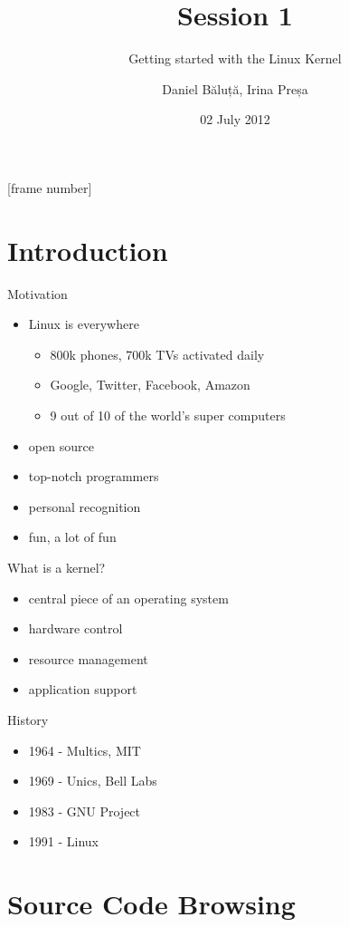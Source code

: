 \documentclass{workshop}
\title[Sesssion 1]{Session 1}
\subtitle{Getting started with the Linux Kernel}
\author{Daniel Băluță, Irina Preșa}
\date{02 July 2012}
\begin{document}
[frame number]

\frame{\titlepage}

\section{Introduction}

\begin{frame}{Motivation}
	\begin{itemize}
	\item Linux is everywhere
	\begin{itemize}
		\item 800k phones, 700k TVs activated daily
		\item Google, Twitter, Facebook, Amazon
		\item 9 out of 10 of the world's super computers
	\end{itemize}
	\item open source
	\item top-notch programmers
	\item personal recognition
	\item fun, a lot of fun
	\end{itemize}
\end{frame}
\begin{frame}{What is a kernel?}
	\begin{itemize}
	\item central piece of an operating system
	\item hardware control
	\item resource management
	\item application support
	\end{itemize}
\end{frame}

\begin{frame}{History}
	\begin{itemize}
	\item 1964 - Multics, MIT
	\item 1969 - Unics, Bell Labs
	\item 1983 - GNU Project
	\item 1991 - Linux
	\end{itemize}
\end{frame}


\section{Source Code Browsing}
\end{document}
